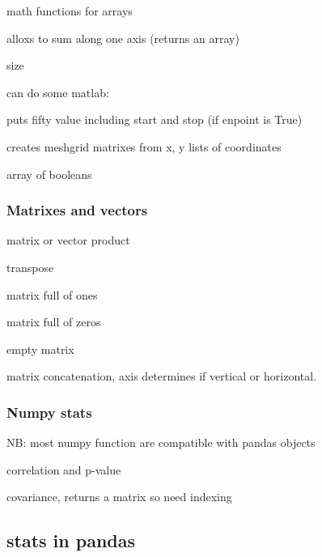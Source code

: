 			 math functions for arrays


			 alloxs to sum along one axis (returns an array)

			 size

			can do some matlab:


			 puts fifty value including start and stop (if enpoint is True)

			 creates meshgrid matrixes from x, y lists of coordinates

			 array of booleans


		\subsubsection{Matrixes and vectors}


			 matrix or vector product

			 transpose

			 matrix full of ones

			 matrix full of zeros

			 empty matrix

			 matrix concatenation, axis determines if vertical or horizontal.

		\subsubsection{Numpy stats}

			NB: most numpy function are compatible with pandas objects
			


			 correlation and p-value

			 covariance, returns a matrix so need indexing


	\subsection{stats in pandas}
		
